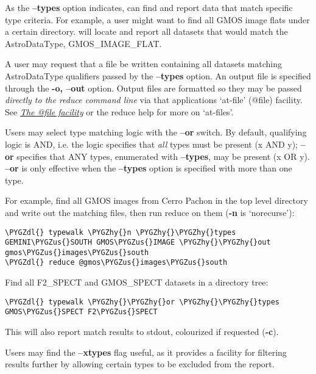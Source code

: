 \documentclass[letterpaper,10pt,english]{sphinxmanual}
\def\PYGZus{\char`\_}
\def\PYGZdl{\char`\$}
\def\PYGZhy{\char`\-}
\begin{document}
As the \textbf{--types} option indicates,  can find and report data that
match specific type criteria. For example, a user might want to find all GMOS
image flats under a certain directory.  will locate and report all
datasets that would match the AstroDataType, GMOS\_IMAGE\_FLAT.

A user may request that a file be written containing all datasets
matching AstroDataType qualifiers passed by the \textbf{--types} option. An output
file is specified through the \textbf{-o, --out} option. Output files are formatted
so they may be passed \emph{directly to the reduce command line} via that applications
`at-file' (@file) facility. See {\hyperref[interfaces:atfile]{\emph{The @file facility}}} or the reduce help for more on
`at-files'.

Users may select type matching logic with the \textbf{--or} switch. By default,
qualifying logic is AND, i.e. the logic specifies that \emph{all} types must be
present (x AND y); \textbf{--or} specifies that ANY types, enumerated with
\textbf{--types}, may be present (x OR y). \textbf{--or} is only effective when the
\textbf{--types} option is specified with more than one type.

For example, find all GMOS images from Cerro Pachon in the top level
directory and write out the matching files, then run reduce on them
(\textbf{-n} is `norecurse'):

\begin{Verbatim}[commandchars=\\\{\}]
\PYGZdl{} typewalk \PYGZhy{}n \PYGZhy{}\PYGZhy{}types GEMINI\PYGZus{}SOUTH GMOS\PYGZus{}IMAGE \PYGZhy{}\PYGZhy{}out gmos\PYGZus{}images\PYGZus{}south
\PYGZdl{} reduce @gmos\PYGZus{}images\PYGZus{}south
\end{Verbatim}

Find all F2\_SPECT and GMOS\_SPECT datasets in a directory tree:

\begin{Verbatim}[commandchars=\\\{\}]
\PYGZdl{} typewalk \PYGZhy{}\PYGZhy{}or \PYGZhy{}\PYGZhy{}types GMOS\PYGZus{}SPECT F2\PYGZus{}SPECT
\end{Verbatim}

This will also report match results to stdout, colourized if requested (\textbf{-c}).

Users may find the \textbf{--xtypes} flag useful, as it provides a facility for
filtering results further by allowing certain types to be excluded from the
report.
\end{document}
